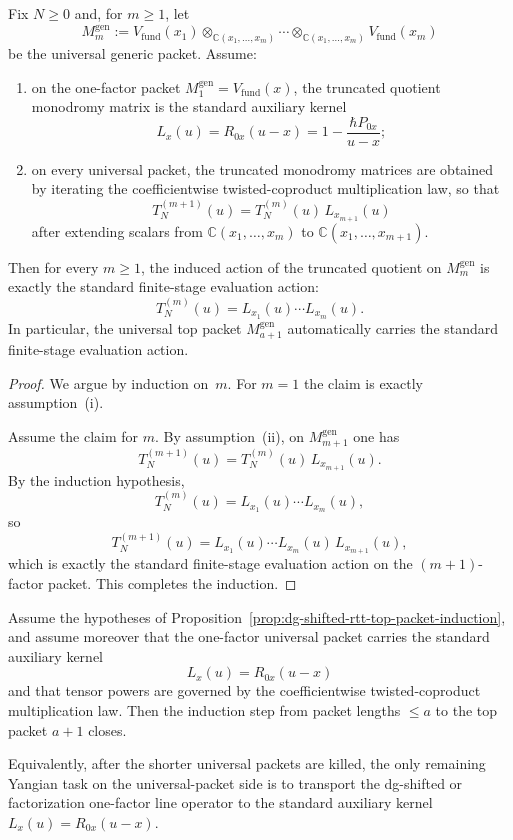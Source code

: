\begin{proposition}
\label{prop:dg-shifted-rtt-universal-evaluation-rigidity}
Fix $N\ge0$ and, for $m\ge1$, let
\[
M_m^{\mathrm{gen}}
:=
V_{\mathrm{fund}}(x_1)\otimes_{\mathbb{C}(x_1,\dots,x_m)}\cdots
\otimes_{\mathbb{C}(x_1,\dots,x_m)}V_{\mathrm{fund}}(x_m)
\]
be the universal generic packet.  Assume:
\begin{enumerate}[label=\textup{(\roman*)}]
\item on the one-factor packet $M_1^{\mathrm{gen}}=V_{\mathrm{fund}}(x)$,
  the truncated quotient monodromy matrix is the standard auxiliary
  kernel
  \[
  L_x(u)=R_{0x}(u-x)=1-\frac{\hbar P_{0x}}{u-x};
  \]
\item on every universal packet, the truncated monodromy matrices are
  obtained by iterating the coefficientwise twisted-coproduct
  multiplication law, so that
  \[
  T_N^{(m+1)}(u)=T_N^{(m)}(u)\,L_{x_{m+1}}(u)
  \]
  after extending scalars from $\mathbb{C}(x_1,\dots,x_m)$ to
  $\mathbb{C}(x_1,\dots,x_{m+1})$.
\end{enumerate}
Then for every $m\ge1$, the induced action of the truncated quotient on
$M_m^{\mathrm{gen}}$ is exactly the standard finite-stage evaluation
action:
\[
T_N^{(m)}(u)=L_{x_1}(u)\cdots L_{x_m}(u).
\]
In particular, the universal top packet $M_{a+1}^{\mathrm{gen}}$
automatically carries the standard finite-stage evaluation action.
\end{proposition}

\begin{proof}
We argue by induction on~$m$.  For $m=1$ the claim is exactly
assumption~\textup{(i)}.

Assume the claim for $m$.  By assumption~\textup{(ii)}, on
$M_{m+1}^{\mathrm{gen}}$ one has
\[
T_N^{(m+1)}(u)=T_N^{(m)}(u)\,L_{x_{m+1}}(u).
\]
By the induction hypothesis,
\[
T_N^{(m)}(u)=L_{x_1}(u)\cdots L_{x_m}(u),
\]
so
\[
T_N^{(m+1)}(u)
=
L_{x_1}(u)\cdots L_{x_m}(u)\,L_{x_{m+1}}(u),
\]
which is exactly the standard finite-stage evaluation action on the
$(m+1)$-factor packet.  This completes the induction.
\end{proof}

\begin{corollary}
\label{cor:dg-shifted-rtt-top-packet-from-one-factor}
Assume the hypotheses of
Proposition~\ref{prop:dg-shifted-rtt-top-packet-induction}, and assume
moreover that the one-factor universal packet carries the standard
auxiliary kernel
\[
L_x(u)=R_{0x}(u-x)
\]
and that tensor powers are governed by the coefficientwise
twisted-coproduct multiplication law.  Then the induction step from
packet lengths $\le a$ to the top packet $a+1$ closes.

Equivalently, after the shorter universal packets are killed, the only
remaining Yangian task on the universal-packet side is to transport
the dg-shifted or factorization one-factor line operator to the
standard auxiliary kernel
$L_x(u)=R_{0x}(u-x)$.
\end{corollary}


